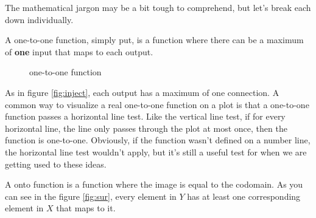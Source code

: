 \documentclass[11pt]{article}
\numberwithin{lemma}{section}
\numberwithin{equation}{section}
\numberwithin{define}{section}
\numberwithin{prop}{section}
\numberwithin{figure}{section}
\numberwithin{theorem}{section}
\newcounter{ex}[section]
\numberwithin{ex}{section}
\begin{document}
The mathematical jargon may be a bit tough to comprehend, but let's break each down individually. 

A one-to-one function, simply put, is a function where there can be a maximum of \textbf{one} input that maps to each output. 
\begin{figure}[h]
\centering
{}
	\caption{one-to-one function}
	\label{fig:inject}
\end{figure}
As in figure \eqref{fig:inject}, each output has a maximum of one connection.
A common way to visualize a real one-to-one function on a plot is that a one-to-one function passes a horizontal line test. 
Like the vertical line test, if for every horizontal line, the line only passes through the plot at most once, then the function is one-to-one. Obviously, if the function wasn't defined on a number line, the horizontal line test wouldn't apply, but it's still a useful test for when we are getting used to these ideas.

A onto function is a function where the image is equal to the codomain. As you can see in the figure \eqref{fig:sur}, every element in $Y$ has at least one corresponding element in $X$ that maps to it. 
\end{document}
